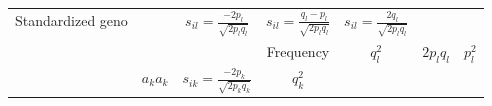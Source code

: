 \documentclass[]{article}
\begin{document}
\begin{longtable}[]{@{}ccccccc@{}}
\begin{minipage}[t]{0.12\columnwidth}
Standardized geno\strut
\end{minipage} & \begin{minipage}[t]{0.12\columnwidth}\centering
\strut
\end{minipage} & \begin{minipage}[t]{0.12\columnwidth}\centering
\(s_{il}=\frac{-2p_l}{\sqrt{2p_lq_l}}\)\strut
\end{minipage} & \begin{minipage}[t]{0.12\columnwidth}\centering
\(s_{il}=\frac{q_l-p_l}{\sqrt{2p_lq_l}}\)\strut
\end{minipage} & \begin{minipage}[t]{0.12\columnwidth}\centering
\(s_{il}=\frac{2q_l}{\sqrt{2p_lq_l}}\)\strut
\end{minipage}\tabularnewline
\begin{minipage}[t]{0.12\columnwidth}\centering
\strut
\end{minipage} & \begin{minipage}[t]{0.12\columnwidth}\centering
\strut
\end{minipage} & \begin{minipage}[t]{0.12\columnwidth}\centering
\strut
\end{minipage} & \begin{minipage}[t]{0.12\columnwidth}\centering
Frequency\strut
\end{minipage} & \begin{minipage}[t]{0.12\columnwidth}\centering
\(q_l^2\)\strut
\end{minipage} & \begin{minipage}[t]{0.12\columnwidth}\centering
\(2p_lq_l\)\strut
\end{minipage} & \begin{minipage}[t]{0.12\columnwidth}\centering
\(p_l^2\)\strut
\end{minipage}\tabularnewline
\begin{minipage}[t]{0.12\columnwidth}\centering
\strut
\end{minipage} & \begin{minipage}[t]{0.12\columnwidth}\centering
\(a_ka_k\)\strut
\end{minipage} & \begin{minipage}[t]{0.12\columnwidth}\centering
\(s_{ik}=\frac{-2p_k}{\sqrt{2p_kq_k}}\)\strut
\end{minipage} & \begin{minipage}[t]{0.12\columnwidth}\centering
\(q_k^2\)\strut
\end{minipage} & \begin{minipage}[t]{0.12\columnwidth}\centering

\end{minipage}
\end{longtable}
\end{document}
